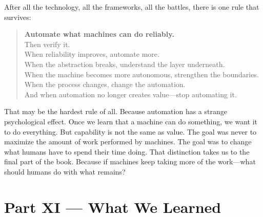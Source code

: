 \documentclass[11pt,twoside]{book}
\begin{document}
After all the technology, all the frameworks, all the battles, there is one rule that survives:
\begin{quote}
\textbf{Automate what machines can do reliably.}\\[0.5em]
Then verify it.\\
When reliability improves, automate more.\\
When the abstraction breaks, understand the layer underneath.\\
When the machine becomes more autonomous, strengthen the boundaries.\\
When the process changes, change the automation.\\
And when automation no longer creates value---stop automating it.
\end{quote}
That may be the hardest rule of all.
Because automation has a strange psychological effect.
Once we learn that a machine can do something, we want it to do everything.
But capability is not the same as value.
The goal was never to maximize the amount of work performed by machines.
The goal was to change what humans have to spend their time doing.
That distinction takes us to the final part of the book.
Because if machines keep taking more of the work---what should humans do with what remains?

\chapter*{Part XI — What We Learned}
\end{document}
